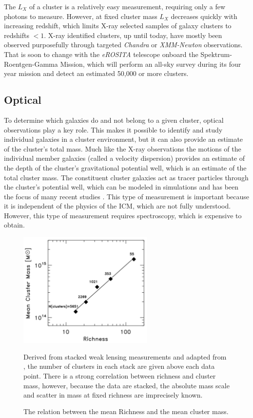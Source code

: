 The $L_X$ of a cluster is a relatively easy measurement, requiring only a few photons to measure. However, at fixed cluster mass $L_X$ decreases quickly with increasing redshift, which limits X-ray selected samples of galaxy clusters to redshifts $< 1$. X-ray identified clusters, up until today, have mostly been observed purposefully through targeted \textit{Chandra} or \textit{XMM-Newton} observations. That is soon to change with the \textit{eROSITA} \citep{Pillepich2012} telescope onboard the Spektrum-Roentgen-Gamma Mission, which will perform an all-sky survey during its four year mission and detect an estimated 50,000 or more clusters.

\subsection{Optical}
To determine which galaxies do and not belong to a given cluster, optical observations play a key role. This makes it possible to identify and study individual galaxies in a cluster environment, but it can also provide an estimate of the cluster's total mass. Much like the X-ray observations the motions of the individual member galaxies (called a velocity dispersion) provides an estimate of the depth of the cluster's gravitational potential well, which is an estimate of the total cluster mass. The constituent cluster galaxies act as tracer particles through the cluster's potential well, which can be modeled in simulations and has been the focus of many recent studies . This type of measurement is important because it is independent of the physics of the ICM, which are not fully understood. However, this type of measurement requires spectroscopy, which is expensive to obtain. 

\begin{figure}[ht]
	\begin{center}
		\includegraphics[width=0.6\textwidth]{figures/massrichness.pdf}
	\end{center}
	\caption{The relation between the mean Richness and the mean cluster mass.} 
	Derived from stacked weak lensing measurements and adapted from \citealt{Rozo2010}, the number of clusters in each stack are given above each data point. There is a strong correlation between richness and cluster mass, however, because the data are stacked, the absolute mass scale and scatter in mass at fixed richness are imprecisely known.
	\label{fig:massrichness}
\end{figure}

